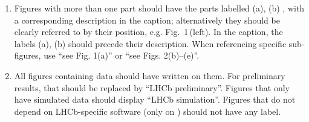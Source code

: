 \begin{enumerate}
\item Figures with more than one part should have the parts labelled
  (a), (b) \etc, with a corresponding description in the caption;
  alternatively they should be clearly referred to by their position,
  e.g. Fig.~1\,(left). In the caption, the labels (a), (b) \etc should
  precede their description. When referencing specific sub-figures,
  use ``see Fig. 1(a)'' or ``see Figs. 2(b)--(e)''.

\item All figures containing \lhcb data should have \lhcb written on
  them. For preliminary
  results, that should be replaced by ``LHCb preliminary''.
  Figures that only have simulated data should display ``LHCb simulation''.
  Figures that do not depend on LHCb-specific software (\eg only on \pythia)
  should not have any label.


\end{enumerate}
